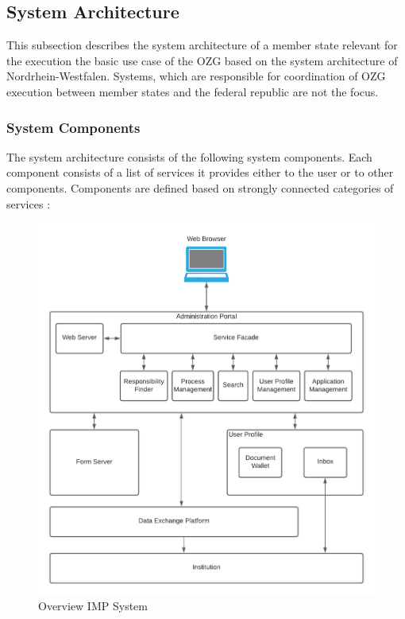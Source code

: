 \documentclass[
     12pt,         %
     a4paper,      %
     BCOR=10mm,version=first,     %
     DIV=14,version=first,        %
     ]{scrreprt}
\begin{document}
\subsection{System Architecture}
This subsection describes the system architecture of a member state relevant for the execution the basic use case of the OZG based on the system architecture of Nordrhein-Westfalen. Systems, which are responsible for coordination of OZG execution between member states and the federal republic are not the focus.

\subsubsection{System Components}
The system architecture consists of the following system components. Each component consists of a list of services it provides either to the user or to other components. Components are defined based on strongly connected categories of services \cite{NRW:Umsetzung}:

\begin{figure}[h]
\caption{Overview IMP System}
    \centering
    \includegraphics[scale=0.25]{Diagrams/OZG System Overview.png}
\end{figure}
\end{document}
